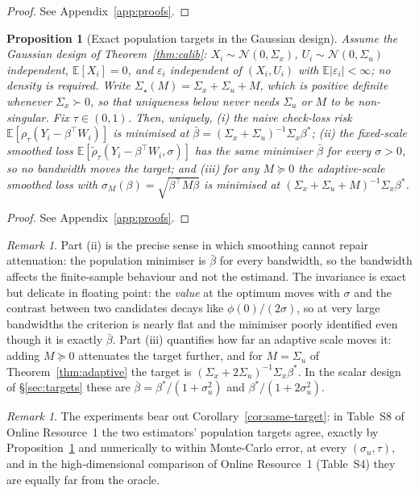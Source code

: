 \documentclass[12pt,a4paper]{article}
\newtheorem{proposition}[theorem]{Proposition}
\theoremstyle{definition}
\theoremstyle{remark}
\newtheorem{remark}[theorem]{Remark}
\newcommand{\E}{\mathbb{E}}
\newcommand{\cN}{\mathcal{N}}
\newcommand{\rht}{\tilde{\rho}_\tau}
\newcommand{\betas}{\beta^*}
\newcommand{\bbar}{\bar{\beta}}
\begin{document}
\begin{proof}
See Appendix~\ref{app:proofs}.
\end{proof}

\begin{proposition}[Exact population targets in the Gaussian design]
\label{prop:exact-target}
Assume the Gaussian design of Theorem~\ref{thm:calib}: $X_i\sim\cN(0,\Sigma_x)$,
$U_i\sim\cN(0,\Sigma_u)$ independent, $\E[X_i]=0$, and $\varepsilon_i$ independent of
$(X_i,U_i)$ with $\E|\varepsilon_i|<\infty$; no density is required. Write
$\Sigma_\star(M)=\Sigma_x+\Sigma_u+M$, which is positive definite whenever $\Sigma_x\succ0$,
so that uniqueness below never needs $\Sigma_u$ or $M$ to be non-singular. Fix
$\tau\in(0,1)$. Then, uniquely, (i) the naive check-loss risk
$\E[\rho_\tau(Y_i-\beta^\top W_i)]$ is minimised at
$\bbar=(\Sigma_x+\Sigma_u)^{-1}\Sigma_x\betas$; (ii) the fixed-scale smoothed loss
$\E[\rht(Y_i-\beta^\top W_i,\sigma)]$ has the same
minimiser $\bbar$ for \emph{every} $\sigma>0$, so no bandwidth moves the target; and
(iii) for any $M\succeq0$ the adaptive-scale smoothed loss with
$\sigma_M(\beta)=\sqrt{\beta^\top M\beta}$ is minimised at
$(\Sigma_x+\Sigma_u+M)^{-1}\Sigma_x\betas$.
\end{proposition}

\begin{proof}
See Appendix~\ref{app:proofs}.
\end{proof}

\begin{remark}
Part (ii) is the precise sense in which smoothing cannot repair attenuation: the population
minimiser is $\bbar$ for every bandwidth, so the bandwidth affects the finite-sample
behaviour and not the estimand. The invariance is exact but delicate in floating point: the
\emph{value} at the optimum moves with $\sigma$ and the contrast between two candidates
decays like $\phi(0)/(2\sigma)$, so at very large bandwidths the criterion is nearly flat
and the minimiser poorly identified even though it is exactly $\bbar$. Part (iii)
quantifies how far an adaptive scale moves it: adding $M\succeq0$ attenuates the target
further, and for $M=\Sigma_u$ of Theorem~\ref{thm:adaptive} the target is
$(\Sigma_x+2\Sigma_u)^{-1}\Sigma_x\betas$. In the scalar design of \S\ref{sec:targets}
these are $\bbar=\betas/(1+\sigma_u^2)$ and $\betas/(1+2\sigma_u^2)$.
\end{remark}

\begin{remark}
The experiments bear out Corollary~\ref{cor:same-target}: in
Table~S8 of Online Resource~1 the two estimators' population targets agree, exactly by
Proposition~\ref{prop:exact-target} and numerically to within Monte-Carlo error, at every
$(\sigma_u,\tau)$, and in the high-dimensional comparison of Online Resource~1 (Table~S4)
they are equally far from the oracle.
\end{remark}
\end{document}
